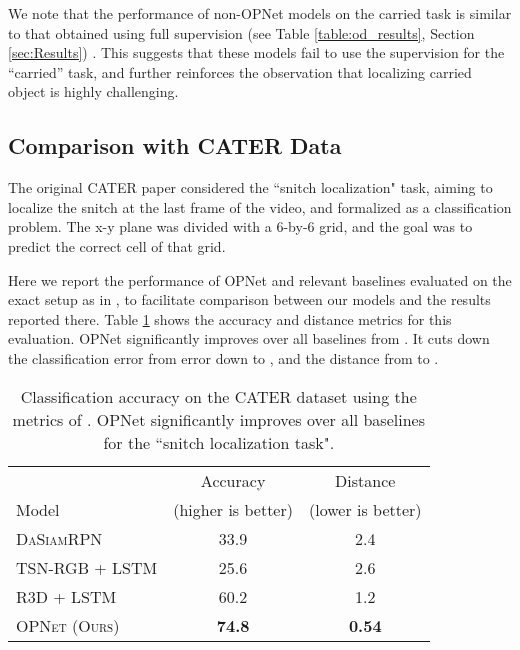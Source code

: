 \documentclass[]{llncs}
\newcommand{\secref}[1]{Section \ref{#1}}
\begin{document}
We note that the performance of non-OPNet models on the carried task is similar to that obtained using full supervision (see Table \ref{table:od_results}, \secref{sec:Results}) . This suggests that these models fail to use the supervision for the ``carried'' task, and further reinforces the observation that localizing carried object is highly challenging.

\subsection{Comparison with CATER Data} \label{sec:cater_res}
The original CATER paper \cite{girdhar2019cater} considered the ``snitch localization" task, aiming to localize the snitch at the last frame of the video, and formalized as a classification problem. The x-y plane was divided with a 6-by-6 grid, and the goal was to predict the correct cell of that grid. 

Here we report the performance of OPNet and relevant baselines evaluated on the exact setup as in \cite{girdhar2019cater}, to facilitate comparison between our models and the results reported there. Table \ref{table:cater_results}
shows the accuracy and  distance metrics for this evaluation. OPNet significantly improves over all baselines from \cite{girdhar2019cater}. It cuts down the classification error from  error down to , and the  distance from  to . 

\begin{table}[h]
    \begin{center}
    \begin{tabular}{|l|c|c|}
    \hline
    & Accuracy &  Distance   \\ 
    Model & \small{(higher is better)}      & \small{(lower is better)}   \\ \hline
    \textsc{DaSiamRPN}             & 33.9 & 2.4 \\
    \textsc{TSN-RGB + LSTM}        & 25.6 & 2.6 \\
    \textsc{R3D + LSTM}            & 60.2 & 1.2 \\ \hline
    \textsc{OPNet (Ours)} & \textbf{74.8} & \textbf{0.54} \\ \hline
    \end{tabular}\end{center}
    \caption{Classification accuracy on the CATER dataset using the metrics of \cite{girdhar2019cater}. OPNet significantly improves over all baselines for the ``snitch localization task".
    \label{table:cater_results}}
\end{table}
\end{document}

